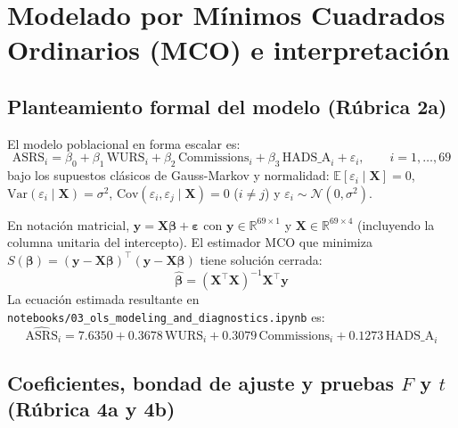 \documentclass[11pt,letterpaper]{article}
\begin{document}
\section{Modelado por Mínimos Cuadrados Ordinarios (MCO) e interpretación}

\subsection{Planteamiento formal del modelo (Rúbrica 2a)}

El modelo poblacional en forma escalar es:
\[
  \text{ASRS}_i = \beta_0 + \beta_1\,\text{WURS}_i + \beta_2\,\text{Commissions}_i + \beta_3\,\text{HADS\_A}_i + \varepsilon_i, \qquad i = 1, \dots, 69
\]
bajo los supuestos clásicos de Gauss-Markov y normalidad: $\mathbb{E}[\varepsilon_i \mid \mathbf{X}] = 0$, $\text{Var}(\varepsilon_i \mid \mathbf{X}) = \sigma^2$, $\text{Cov}(\varepsilon_i, \varepsilon_j \mid \mathbf{X}) = 0$ ($i \neq j$) y $\varepsilon_i \sim \mathcal{N}(0, \sigma^2)$.

En notación matricial, $\mathbf{y} = \mathbf{X}\boldsymbol{\beta} + \boldsymbol{\varepsilon}$ con $\mathbf{y} \in \mathbb{R}^{69 \times 1}$ y $\mathbf{X} \in \mathbb{R}^{69 \times 4}$ (incluyendo la columna unitaria del intercepto). El estimador MCO que minimiza $S(\boldsymbol{\beta}) = (\mathbf{y} - \mathbf{X}\boldsymbol{\beta})^\top(\mathbf{y} - \mathbf{X}\boldsymbol{\beta})$ tiene solución cerrada:
\[
  \hat{\boldsymbol{\beta}} = (\mathbf{X}^\top \mathbf{X})^{-1}\mathbf{X}^\top \mathbf{y}
\]
La ecuación estimada resultante en \texttt{notebooks/03\_ols\_modeling\_and\_diagnostics.ipynb} es:
\[
  \widehat{\text{ASRS}}_i = 7.6350 + 0.3678\,\text{WURS}_i + 0.3079\,\text{Commissions}_i + 0.1273\,\text{HADS\_A}_i
\]

\subsection{Coeficientes, bondad de ajuste y pruebas $F$ y $t$ (Rúbrica 4a y 4b)}
\end{document}
